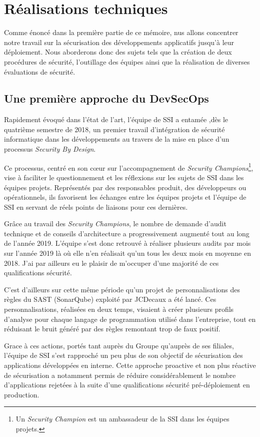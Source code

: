 \chapter{Réalisations techniques}
Comme énoncé dans la première partie de ce mémoire, nus allons concentrer notre travail sur la sécurisation des 
développements applicatifs jusqu'à leur déploiement. Nous aborderons donc des sujets tels que la création de deux 
procédures de sécurité, l'outillage des équipes ainsi que la réalisation de diverses évaluations de sécurité.

\section{Une première approche du DevSecOps}
Rapidement évoqué dans l'état de l'art, l'équipe de \ac{SSI} a entamée ,dès le quatrième semestre de 2018, un premier 
travail d'intégration de sécurité informatique dans les développements au travers de la mise en place d'un processus 
\emph{Security By Design}.

Ce processus, centré en son cœur sur l'accompagnement de \emph{Security Champions}\footnote{Un 
\emph{Security Champion} est un ambassadeur de la \ac{SSI} dans les équipes projets.}, vise à faciliter le questionnement
et  les réflexions sur les sujets de \ac{SSI} dans les équipes projets. Représentés par des responsables produit, des 
développeurs ou opérationnels, ils favorisent les échanges entre les équipes projets et l'équipe de \ac{SSI} en servant 
de réels points de liaisons pour ces dernières.

Grâce au travail des \emph{Security Champions}, le nombre de demande d'audit technique et de conseils d'architecture
a progressivement augmenté tout au long de l'année 2019. L'équipe s'est donc retrouvé à réaliser plusieurs audits par 
mois sur l'année 2019 là où elle n'en réalisait qu'un tous les deux mois en moyenne en 2018. J'ai par ailleurs eu le 
plaisir de m'occuper d'une majorité de ces qualifications sécurité.

C'est d'ailleurs sur cette même période qu'un projet de personnalisations des règles du \ac{SAST} (SonarQube) exploité 
par JCDecaux a été lancé. Ces personnalisations, réalisées en deux temps, visaient à créer plusieurs profils d'analyse 
pour chaque langage de programmation utilisé dans l'entreprise, tout en réduisant le bruit généré par des règles 
remontant trop de faux positif.

Grace à ces actions, portés tant auprès du Groupe qu'auprès de ses filiales, l'équipe de \ac{SSI} s'est rapproché un peu
plus de son objectif de sécurisation des applications développées en interne. Cette approche proactive et non plus 
réactive de sécurisation a notamment permis de réduire considérablement le nombre d'applications rejetées à la suite d'une 
qualifications sécurité pré-déploiement en production.

